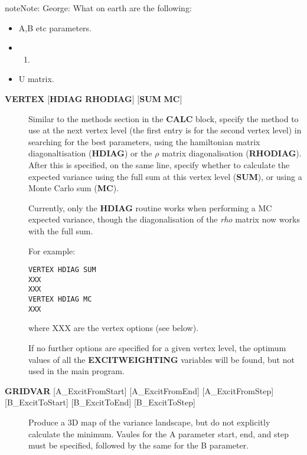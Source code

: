 \documentclass[openany,a4paper,10pt,english]{manual}
\begin{document}
\begin{notice}{note}{Note:}
George:
What on earth are the following:
\begin{itemize}
\item {} 
A,B etc parameters.

\item {} \begin{enumerate}
\item {} 
\end{enumerate}

\item {} 
U matrix.

\end{itemize}
\end{notice}
\begin{description}
\item[\textbf{VERTEX} {[}\textbf{HDIAG} \textbf{RHODIAG}{]} {[}\textbf{SUM} \textbf{MC}{]}] \leavevmode
Similar to the methods section in the \textbf{CALC} block, specify the
method to use at the next vertex level (the first entry is for the
second vertex level) in searching for the best parameters, using the
hamiltonian matrix diagonaltisation (\textbf{HDIAG}) or the $\rho$
matrix diagonalisation (\textbf{RHODIAG}). After this is specified, on
the same line, specify whether to calculate the expected variance
using the full sum at this vertex level (\textbf{SUM}), or using a Monte
Carlo sum (\textbf{MC}).

Currently, only the \textbf{HDIAG} routine works when performing a MC
expected variance, though the diagonalisation of the \emph{rho} matrix
now works with the full sum.

For example:

\begin{Verbatim}[commandchars=@\[\]]
VERTEX HDIAG SUM
XXX
XXX
VERTEX HDIAG MC
XXX
\end{Verbatim}

where XXX are the vertex options (see below).

If no further options are specified for a given vertex level, the
optimum values of all the \textbf{EXCITWEIGHTING} variables will be found,
but not used in the main program.

\item[\textbf{GRIDVAR} {[}A\_ExcitFromStart{]} {[}A\_ExcitFromEnd{]} {[}A\_ExcitFromStep{]} {[}B\_ExcitToStart{]} {[}B\_ExcitToEnd{]} {[}B\_ExcitToStep{]}] \leavevmode
Produce a 3D map of the variance landscape, but do not explicitly
calculate the minimum. Vaules for the A parameter start, end, and
step must be specified, followed by the same for the B parameter.


\end{description}
\end{document}
